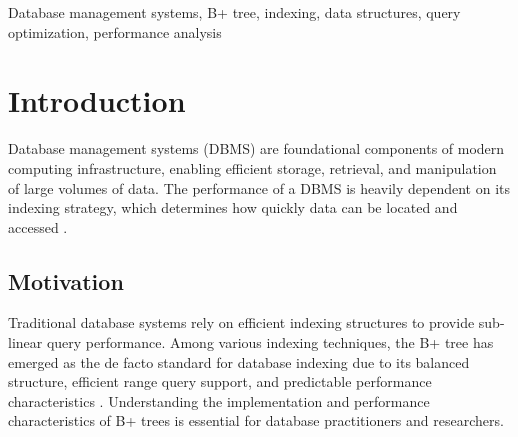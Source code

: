 \documentclass[conference]{IEEEtran}
\begin{document}
\begin{IEEEkeywords}
Database management systems, B+ tree, indexing, data structures, query optimization, performance analysis
\end{IEEEkeywords}
                                                                                                                                                                                                                                                                                                                                                                                                                                                                                                                                                                                                                                                                                                                                                                                                                                                                                                                                                                                                                                                                                                                                                                                                   
\section{Introduction}

Database management systems (DBMS) are foundational components of modern computing infrastructure, enabling efficient storage, retrieval, and manipulation of large volumes of data. The performance of a DBMS is heavily dependent on its indexing strategy, which determines how quickly data can be located and accessed \cite{ramakrishnan2003database}.

\subsection{Motivation}

Traditional database systems rely on efficient indexing structures to provide sub-linear query performance. Among various indexing techniques, the B+ tree has emerged as the de facto standard for database indexing due to its balanced structure, efficient range query support, and predictable performance characteristics \cite{comer1979ubiquitous}. Understanding the implementation and performance characteristics of B+ trees is essential for database practitioners and researchers.
\end{document}
